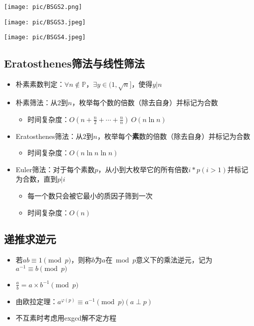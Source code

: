 \documentclass{beamer}
\begin{document}
\begin{frame}
\texttt{[image: pic/BSGS2.png]}
\end{frame}

\begin{frame}
\texttt{[image: pic/BSGS3.jpeg]}
\end{frame}

\begin{frame}
\texttt{[image: pic/BSGS4.jpeg]}
\end{frame}

\subsection{Eratosthenes筛法与线性筛法}

\begin{frame}
\begin{itemize}[<+-| alert@+>]
	\item 朴素素数判定：$\forall n \notin \mathbb{P}$，$\exists y \in (1,\sqrt{n}]$，使得$y|n$
	\item 朴素筛法：从$2$到$n$，枚举每个数的倍数（除去自身）并标记为合数
	\begin{itemize}[<+-| alert@+>]
		\item 时间复杂度：$O(n+\frac{n}{2}+\cdots+\frac{n}{n})~O(n \ln n)$
	\end{itemize}
	\item Eratosthenes筛法：从$2$到$n$，枚举每个\textbf{素}数的倍数（除去自身）并标记为合数
	\begin{itemize}[<+-| alert@+>]
		\item 时间复杂度：$O(n \ln n \ln n)$
	\end{itemize}
	\item Euler筛法：对于每个素数$p$，从小到大枚举它的所有倍数$i*p(i>1)$并标记为合数，直到$p|i$
	\begin{itemize}[<+-| alert@+>]
		\item 每一个数只会被它最小的质因子筛到一次
		\item 时间复杂度：$O(n)$
	\end{itemize}
\end{itemize}
\end{frame}

\subsection{递推求逆元}

\begin{frame}
\begin{itemize}[<+-| alert@+>]
	\item 若$ab \equiv 1 \pmod p$，则称$b$为$a$在$\bmod p$意义下的乘法逆元，记为$a^{-1} \equiv b \pmod p$
	\item $\frac{a}{b}=a \times b^{-1} \pmod p$
	\item 由欧拉定理：$a^{\varphi(p)} \equiv a^{-1} \pmod p(a\perp p)$
	\item 不互素时考虑用exgcd解不定方程
\end{itemize}
\end{frame}

\end{document}
